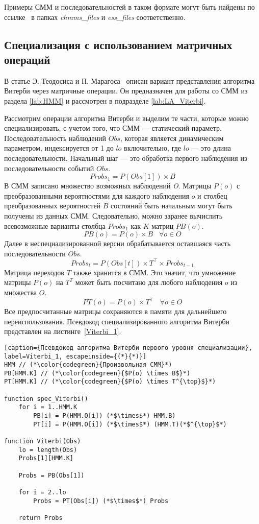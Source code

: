 Примеры СММ и последовательностей в таком формате могут быть 
найдены по ссылке~\cite{repo} в папках \emph{chmms\_files} и \emph{ess\_files} соответственно.

\subsection{Специализация с использованием матричных\\ операций}
\label{lab:LA_spec}
В статье Э. Теодосиса и П. Марагоса~\cite{LA_Viterbi} описан 
вариант представления алгоритма Витерби через матричные 
операции.
Он предназначен для работы со СММ из раздела 
\ref{lab:HMM} и рассмотрен в подразделе 
\ref{lab:LA_Viterbi}.

Рассмотрим операции алгоритма Витерби и выделим те части, которые можно специализировать, с учетом того, что 
СММ --- статический параметр.
Последовательность наблюдений $Obs$, которая является 
динамическим параметром, индексируется от 1 до $lo$ 
включительно, где $lo$ --- это длина последовательности.
Начальный шаг --- это обработка первого наблюдения из 
последовательности событий $Obs$.
\[Probs_{1} = P(Obs[1]) \times B\]
В СММ записано множество возможных наблюдений \emph{O}.
Матрицы $P(o)$ с преобразованными вероятностями для каждого 
наблюдения $o$ и столбец преобразованных вероятностей 
$B$ состояний быть начальным могут быть
получены из данных СММ.
Следовательно, можно заранее вычислить всевозможные варианты 
столбца $Probs_{1}$ как $K$ матриц $PB(o)$. 
\[PB(o) = P(o) \times B \;\;\; \forall o \in O\]
Далее в неспециализированной версии обрабатывается оставшаяся 
часть последовательности $Obs$.
\[Probs_{t} = P(Obs[t]) \times T^{\top} \times Probs_{t - 1}\]
Матрица переходов $T$ также хранится в СММ.
Это значит, что умножение матрицы $P(o)$ на $T^{T}$ 
может быть посчитано для любого наблюдения $o$ из множества $O$.
\[PT(o) = P(o) \times T^{\top} \;\;\; \forall o \in O\]
Все предпосчитанные матрицы сохраняются в памяти для 
дальнейшего переиспользования.
Псевдокод специализированного алгоритма Витерби представлен 
на листинге~\ref{Viterbi_1}.
\begin{lstlisting}[caption={Псевдокод алгоритма Витерби первого уровня специализации}, label=Viterbi_1, escapeinside={(*}{*)}]
HMM // (*\color{codegreen}{Произвольная СММ}*)
PB[HMM.K] // (*\color{codegreen}{$P(o) \times B$}*)
PT[HMM.K] // (*\color{codegreen}{$P(o) \times T^{\top}$}*)

function spec_Viterbi()
	for i = 1..HMM.K
		PB[i] = P(HMM.O[i]) (*$\times$*) HMM.B)
		PT[i] = P(HMM.O[i]) (*$\times$*) (HMM.T)(*$^{\top}$*)

function Viterbi(Obs)
	lo = length(Obs)
	Probs[1][HMM.K]

	Probs = PB(Obs[1])
	
	for i = 2..lo
		Probs = PT(Obs[i]) (*$\times$*) Probs
		
	return Probs
\end{lstlisting}

